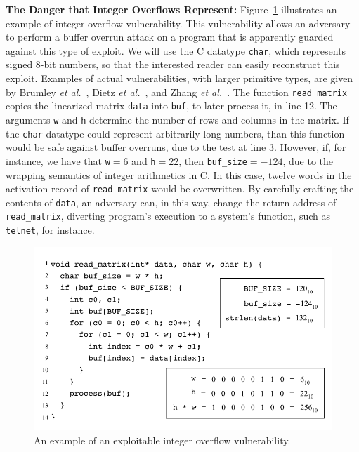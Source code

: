 \documentclass{sigplanconf}[10pt]
\begin{document}
\noindent
\textbf{The Danger that Integer Overflows Represent: }
Figure~\ref{fig:ex_buffer_overflow} illustrates an example of integer
overflow vulnerability.
This vulnerability allows an adversary to perform a buffer overrun attack
on a program that is apparently guarded against this type of exploit.
We will use the C datatype \texttt{char}, which represents
signed 8-bit numbers, so that the interested reader can easily
reconstruct this exploit.
Examples of actual vulnerabilities, with larger primitive types, are given
by Brumley {\em et al.}~\cite{Brumley07}, Dietz {\em et al.}~\cite{Dietz12},
and Zhang {\em et al.}~\cite{Zhang10}.
The function \texttt{read\_matrix} copies the linearized matrix \texttt{data}
into \texttt{buf}, to later process it, in line 12.
The arguments \texttt{w} and \texttt{h} determine the number of rows and
columns in the matrix.
If the \texttt{char} datatype could represent arbitrarily long numbers, than
this function would be safe against buffer overruns, due to the test at
line 3.
However, if, for instance, we have that \texttt{w}$= 6$ and \texttt{h}$= 22$,
then \texttt{buf\_size}$= -124$, due to the wrapping semantics of
integer arithmetics in C.
In this case, twelve words in the activation record of \texttt{read\_matrix}
would be overwritten.
By carefully crafting the contents of \texttt{data}, an adversary can, in this
way, change the return address of \texttt{read\_matrix}, diverting program's
execution to a system's function, such as \texttt{telnet}, for instance.

\begin{figure}[t!]
\begin{center}
\includegraphics[width=\columnwidth]{images/ex_buffer_overflow}
\end{center}
\caption{\label{fig:ex_buffer_overflow}
An example of an exploitable integer overflow vulnerability.}
\end{figure}
\end{document}
